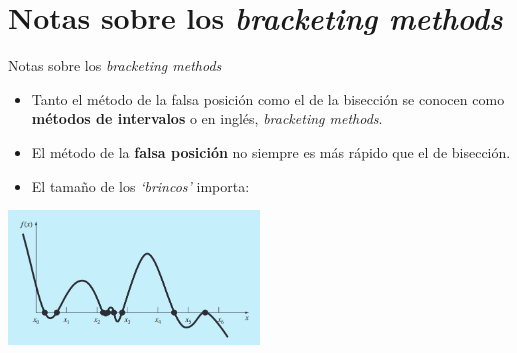 \documentclass[spanish, c]{beamer}
\begin{document}
\section{Notas sobre los \textit{bracketing methods}}

\begin{frame}{Notas sobre los \textit{bracketing methods}}

    \begin{itemize}
        \itemsep3ex
        \item Tanto el método de la falsa posición como el de la bisección se conocen como \textbf{métodos de intervalos} o en inglés, \textit{bracketing methods}.
        \item El método de la \textbf{falsa posición} no siempre es más rápido que el de bisección.
        \item El tamaño de los \textit{`brincos'} importa:
    \end{itemize}

    \begin{center}
        \includegraphics[width=0.5\textwidth]{steps.png}
    \end{center}

\end{frame}




\end{document}
